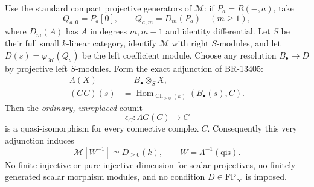 Use the standard compact projective generators of \(\mathcal M\):
if \(P_a=R(-,a)\), take
\[
 Q_{a,0}=P_a[0],\qquad Q_{a,m}=D_m(P_a)\quad(m\ge1),
                                                               \tag{SM39.4}
\]
where \(D_m(A)\) has \(A\) in degrees \(m,m-1\) and identity
differential.  Let \(S\) be their full small \(k\)-linear
category, identify \(\mathcal M\) with right \(S\)-modules,
and let \(D(s)=\varphi_{\mathcal M}(Q_s)\) be the left
coefficient module.  Choose any resolution
\(B_\bullet\to D\) by projective left \(S\)-modules.
Form the exact adjunction of BR-13405:
\[
 \begin{aligned}
 \Lambda(X)&=B_\bullet\otimes_S X,\\
 (GC)(s)&=\operatorname{Hom}_{\operatorname{Ch}_{\ge0}(k)}
                                  (B_\bullet(s),C).
 \end{aligned}                                               \tag{SM39.5}
\]
Then the \emph{ordinary, unreplaced} counit
\[
                    \epsilon_C:\Lambda G(C)\longrightarrow C
                                                               \tag{SM39.6}
\]
is a quasi-isomorphism for every connective complex \(C\).
Consequently this very adjunction induces
\[
 \mathcal M[W^{-1}]\simeq D_{\ge0}(k),\qquad
          W=\Lambda^{-1}(\mathrm{qis}).                     \tag{SM39.7}
\]
No finite injective or pure-injective dimension for scalar
projectives, no finitely generated scalar morphism modules,
and no condition \(D\in\mathrm{FP}_\infty\) is imposed.

